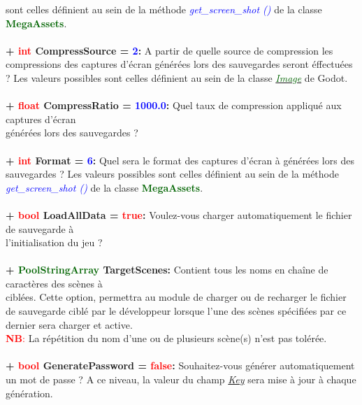 \documentclass[a4paper, 11pt]{article}
\begin{document}
	sont celles définient au sein de la méthode \textit{\textcolor{blue}{get\_screen\_shot ()}} de la classe 
	\textbf{\textcolor{darkgreen}{MegaAssets}}.\\\\
	\textbf{+ \textcolor{red}{int} CompressSource = \textcolor{blue}{2}:} A partir de quelle source de
	compression les compressions des captures d'écran générées lors des sauvegardes seront éffectuées ? Les
	valeurs possibles sont celles définient au sein de la classe
	\href{https://docs.godotengine.org/en/stable/classes/class_image.html#enum-image-compresssource}
	{\textit{\textcolor{darkgreen}{Image}}} de Godot.\\\\
	\textbf{+ \textcolor{red}{float} CompressRatio = \textcolor{blue}{1000.0}:} Quel taux de compression
	appliqué aux captures d'écran \\générées lors des sauvegardes ?\\\\
	\textbf{+ \textcolor{red}{int} Format = \textcolor{blue}{6}:} Quel sera le format des captures d'écran à 
	générées lors des sauvegardes ? Les valeurs possibles sont celles définient au sein de la méthode
	\textit{\textcolor{blue}{get\_screen\_shot ()}} de la classe \textbf{\textcolor{darkgreen}{MegaAssets}}.
	\\\\
	\textbf{+ \textcolor{red}{bool} LoadAllData = \textcolor{red}{true}:} Voulez-vous charger
	automatiquement le fichier de sauvegarde à \\l'initialisation du jeu ?\\\\
	\textbf{+ \textcolor{darkgreen}{PoolStringArray} TargetScenes:} Contient tous les noms en chaîne de
	caractères des scènes à \\ciblées. Cette option, permettra au module de charger ou de recharger le 
	fichier de sauvegarde ciblé par le développeur lorsque l'une des scènes spécifiées par ce dernier sera 
	charger et active.\\
	\textcolor{red}{\textbf{NB}:} La répétition du nom d'une ou de plusieurs scène(s) n'est pas tolérée.\\\\
	\textbf{+ \textcolor{red}{bool} \hypertarget{genpass}{GeneratePassword} = \textcolor{red}{false}:}
	Souhaitez-vous générer automatiquement un mot de passe ? A ce niveau, la valeur du champ
	\textit{\hyperlink{pass}{Key}} sera mise à jour à chaque génération.
\end{document}
